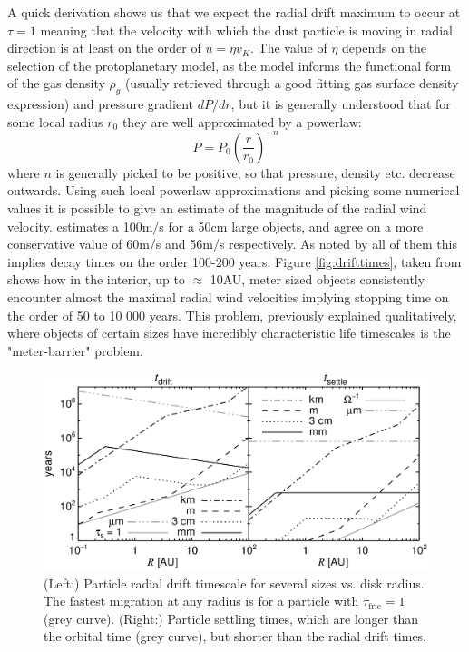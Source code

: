 \documentclass[12pt]{article}
\begin{document}
A quick derivation shows us that we expect the radial drift maximum to occur at $\tau=1$ meaning that the velocity with which the dust particle is moving in radial direction is at least on the order of $u=\eta v_K$. The value of $\eta$ depends on the selection of the protoplanetary model, as the model informs the functional form of the gas density $\rho_g$ (usually retrieved through a good fitting gas surface density expression) and pressure gradient $dP/dr$, but it is generally understood that for some local radius $r_0$ they are well approximated by a powerlaw: 
$$P = P_0 \left(\frac{r}{r_0}\right)^{-n}$$
\noindent where $n$ is generally picked to be positive, so that pressure, density etc. decrease outwards. Using such local powerlaw approximations and picking some numerical values it is possible to give an estimate of the magnitude of the radial wind velocity. \citet{Weidenschilling77} estimates a 100m/s for a 50cm large objects, \cite{Armitage07} and \cite{LesHouches} agree on a more conservative value of 60m/s and 56m/s respectively. As noted by all of them this implies decay times on the order 100-200 years. Figure \ref{fig:drifttimes}, taken from \cite{LesHouches} shows how in the interior, up to $\approx$ 10AU, meter sized objects consistently encounter almost the maximal radial wind velocities implying stopping time on the order of 50 to 10 000 years. This problem, previously explained qualitatively, where objects of certain sizes have incredibly characteristic life timescales  is the "meter-barrier" problem.
\begin{figure}[htbp]
    \label{fig:drifttimes}
    \centering
    \includegraphics[width=0.8\linewidth]{drifttimesnotxt.png}
    \caption{(Left:) Particle radial drift timescale for several sizes vs. disk radius. The fastest migration at any radius is for a particle with $\tau_\mathrm{fric} = 1$ (grey curve). (Right:) Particle settling times, which are longer than the orbital time (grey curve), but shorter than the radial drift times.}
    \label{fig:my_label}
\end{figure}
\end{document}
